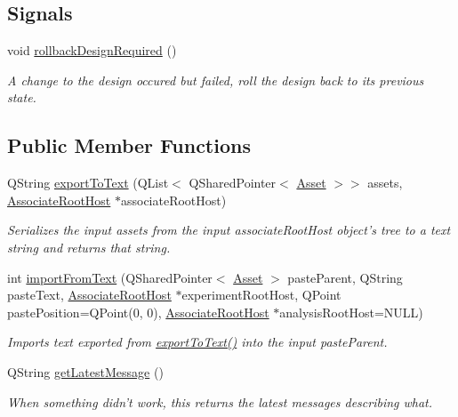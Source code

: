 \subsection*{Signals}
\begin{DoxyCompactItemize}
\item 
\hypertarget{class_asset_export_import_ac5e6cc644505281203cb591ccdfe1bca}{void \hyperlink{class_asset_export_import_ac5e6cc644505281203cb591ccdfe1bca}{rollback\-Design\-Required} ()}\label{class_asset_export_import_ac5e6cc644505281203cb591ccdfe1bca}

\begin{DoxyCompactList}\small\item\em A change to the design occured but failed, roll the design back to its previous state. \end{DoxyCompactList}\end{DoxyCompactItemize}
\subsection*{Public Member Functions}
\begin{DoxyCompactItemize}
\item 
Q\-String \hyperlink{class_asset_export_import_a164a5810ba088a4577ecb5e7b81a12ef}{export\-To\-Text} (Q\-List$<$ Q\-Shared\-Pointer$<$ \hyperlink{class_picto_1_1_asset}{Asset} $>$$>$ assets, \hyperlink{class_picto_1_1_associate_root_host}{Associate\-Root\-Host} $\ast$associate\-Root\-Host)
\begin{DoxyCompactList}\small\item\em Serializes the input assets from the input associate\-Root\-Host object's tree to a text string and returns that string. \end{DoxyCompactList}\item 
int \hyperlink{class_asset_export_import_ac05d9fb6c66ad9a103eaef364f96dd77}{import\-From\-Text} (Q\-Shared\-Pointer$<$ \hyperlink{class_picto_1_1_asset}{Asset} $>$ paste\-Parent, Q\-String paste\-Text, \hyperlink{class_picto_1_1_associate_root_host}{Associate\-Root\-Host} $\ast$experiment\-Root\-Host, Q\-Point paste\-Position=Q\-Point(0, 0), \hyperlink{class_picto_1_1_associate_root_host}{Associate\-Root\-Host} $\ast$analysis\-Root\-Host=N\-U\-L\-L)
\begin{DoxyCompactList}\small\item\em Imports text exported from \hyperlink{class_asset_export_import_a164a5810ba088a4577ecb5e7b81a12ef}{export\-To\-Text()} into the input paste\-Parent. \end{DoxyCompactList}\item 
\hypertarget{class_asset_export_import_aa03bd0281fb6cadcbb8dc22f6b4f9d2d}{Q\-String \hyperlink{class_asset_export_import_aa03bd0281fb6cadcbb8dc22f6b4f9d2d}{get\-Latest\-Message} ()}\label{class_asset_export_import_aa03bd0281fb6cadcbb8dc22f6b4f9d2d}

\begin{DoxyCompactList}\small\item\em When something didn't work, this returns the latest messages describing what. \end{DoxyCompactList}\end{DoxyCompactItemize}

